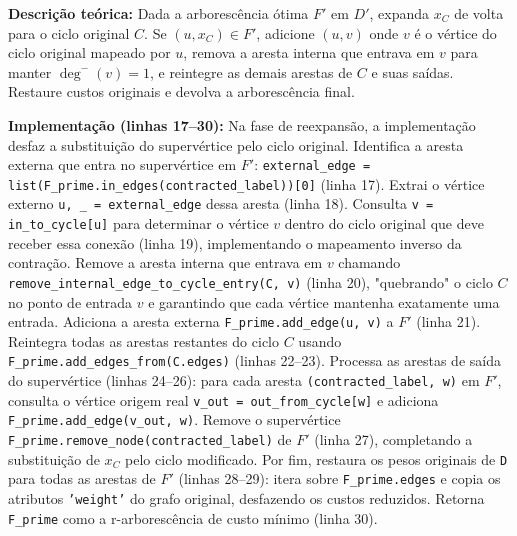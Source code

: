 \begin{tcolorbox}[
        enhanced, breakable,
        colframe=green!60!black, colback=green!5,
        colbacktitle=green!20, coltitle=black,
        title={Passo 5: Reexpansão do ciclo contraído},
        boxed title style={sharp corners, boxrule=0.6pt},
        sharp corners, boxrule=0.6pt
    ]
    \textbf{Descrição teórica:} Dada a arborescência ótima \(F'\) em \(D'\), expanda \(x_C\) de volta para o ciclo original \(C\). Se \((u,x_C)\in F'\), adicione \((u,v)\) onde \(v\) é o vértice do ciclo original mapeado por \(u\), remova a aresta interna que entrava em \(v\) para manter \(\deg^-(v)=1\), e reintegre as demais arestas de \(C\) e suas saídas. Restaure custos originais e devolva a arborescência final.

    \tcblower

    \textbf{Implementação (linhas 17--30):} Na fase de reexpansão, a implementação desfaz a substituição do supervértice pelo ciclo original. Identifica a aresta externa que entra no supervértice em \(F'\): \texttt{external\_edge = list(F\_prime.in\_edges(contracted\_label))[0]} (linha 17). Extrai o vértice externo \texttt{u, \_ = external\_edge} dessa aresta (linha 18). Consulta \texttt{v = in\_to\_cycle[u]} para determinar o vértice \(v\) dentro do ciclo original que deve receber essa conexão (linha 19), implementando o mapeamento inverso da contração. Remove a aresta interna que entrava em \(v\) chamando \texttt{remove\_internal\_edge\_to\_cycle\_entry(C, v)} (linha 20), "quebrando" o ciclo \(C\) no ponto de entrada \(v\) e garantindo que cada vértice mantenha exatamente uma entrada. Adiciona a aresta externa \texttt{F\_prime.add\_edge(u, v)} a \(F'\) (linha 21). Reintegra todas as arestas restantes do ciclo \(C\) usando \texttt{F\_prime.add\_edges\_from(C.edges)} (linhas 22--23). Processa as arestas de saída do supervértice (linhas 24--26): para cada aresta \texttt{(contracted\_label, w)} em \(F'\), consulta o vértice origem real \texttt{v\_out = out\_from\_cycle[w]} e adiciona \texttt{F\_prime.add\_edge(v\_out, w)}. Remove o supervértice \texttt{F\_prime.remove\_node(contracted\_label)} de \(F'\) (linha 27), completando a substituição de \(x_C\) pelo ciclo modificado. Por fim, restaura os pesos originais de \texttt{D} para todas as arestas de \(F'\) (linhas 28--29): itera sobre \texttt{F\_prime.edges} e copia os atributos \texttt{'weight'} do grafo original, desfazendo os custos reduzidos. Retorna \texttt{F\_prime} como a r-arborescência de custo mínimo (linha 30).


\end{tcolorbox}
